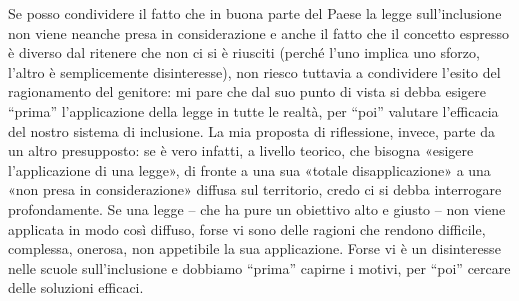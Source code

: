 Se posso condividere il fatto che in buona parte del Paese la legge sull'inclusione non viene neanche presa in considerazione e anche il fatto che il concetto espresso è diverso dal ritenere che non ci si è riusciti (perché l'uno implica uno sforzo, l'altro è semplicemente disinteresse), non riesco tuttavia a condividere l'esito del ragionamento del genitore: mi pare che dal suo punto di vista si debba esigere “prima” l'applicazione della legge in tutte le realtà, per “poi” valutare l'efficacia del nostro sistema di inclusione.
La mia proposta di riflessione, invece, parte da un altro presupposto: se è vero infatti, a livello teorico, che bisogna «esigere l'applicazione di una legge», di fronte a una sua «totale disapplicazione» a una «non presa in considerazione» diffusa sul territorio, credo ci si debba interrogare profondamente.
Se una legge – che ha pure un obiettivo alto e giusto – non viene applicata in modo così diffuso, forse vi sono delle ragioni che rendono difficile, complessa, onerosa, non appetibile la sua applicazione. Forse vi è un disinteresse nelle scuole sull'inclusione e dobbiamo “prima” capirne i motivi, per “poi” cercare delle soluzioni efficaci.

